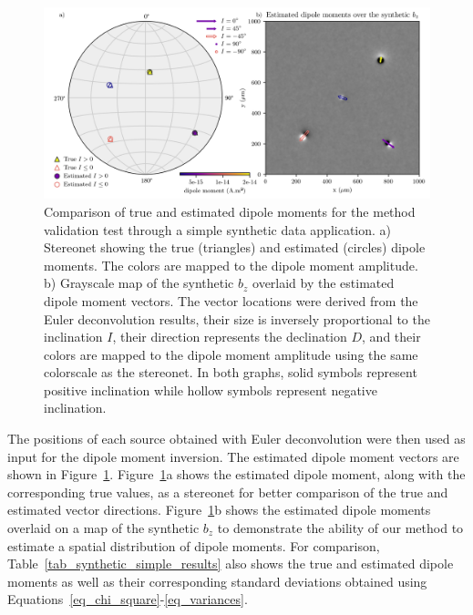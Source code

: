 \begin{figure}[tb!]
  \centering
  \includegraphics[width=\linewidth]{figures/simple-synthetic-dipole-moment.png}
  \caption{
    Comparison of true and estimated dipole moments for the method validation test through a simple synthetic data application.
    a) Stereonet showing the true (triangles) and estimated (circles) dipole moments.
    The colors are mapped to the dipole moment amplitude.
    b) Grayscale map of the synthetic $b_z$ overlaid by the estimated dipole moment vectors.
    The vector locations were derived from the Euler deconvolution results, their size is inversely proportional to the inclination $I$, their direction represents the declination $D$, and their colors are mapped to the dipole moment amplitude using the same colorscale as the stereonet.
    In both graphs, solid symbols represent positive inclination while hollow symbols represent negative inclination.
  }
  \label{fig_synthetic_simple_results}
\end{figure}

The positions of each source obtained with Euler deconvolution were then used as input for the dipole moment inversion.
The estimated dipole moment vectors are shown in Figure~\ref{fig_synthetic_simple_results}.
Figure~\ref{fig_synthetic_simple_results}a shows the estimated dipole moment, along with the corresponding true values, as a stereonet for better comparison of the true and estimated vector directions.
Figure~\ref{fig_synthetic_simple_results}b shows the estimated dipole moments overlaid on a map of the synthetic $b_z$ to demonstrate the ability of our method to estimate a spatial distribution of dipole moments.
For comparison, Table~\ref{tab_synthetic_simple_results} also shows the true and estimated dipole moments as well as their corresponding standard deviations obtained using Equations~\ref{eq_chi_square}-\ref{eq_variances}.



